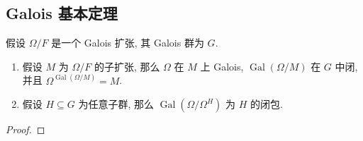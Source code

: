 \subsection{Galois 基本定理}

\begin{proposition}
  假设 \( \Omega/F \) 是一个 Galois 扩张, 其 Galois 群为 \( G \).
  \begin{enumerate}
    \item 假设 \( M \) 为 \( \Omega / F \) 的子扩张, 那么 \( \Omega \) 在 \( M
      \) 上 Galois, \( \operatorname{Gal}(\Omega/M) \) 在 \( G \) 中闭, 并且 \(
      \Omega^{\operatorname{Gal}(\Omega/M)} = M \).
    \item 假设 \( H \subseteq G \) 为任意子群, 那么 \(
      \operatorname{Gal}(\Omega/\Omega^H) \) 为 \( H \) 的闭包.
  \end{enumerate}
\end{proposition}
\begin{proof}
\end{proof}
